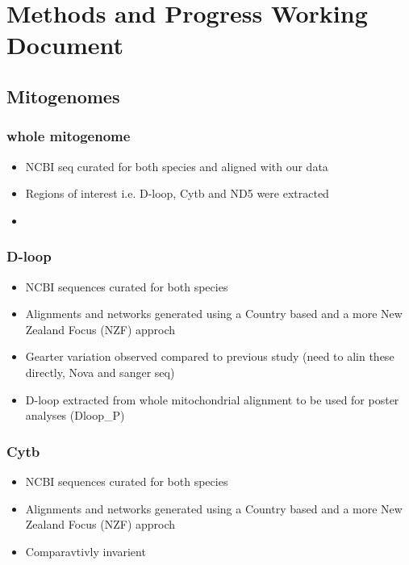 \documentclass[document.tex]{subfiles}
\begin{document}
\chapter{Methods and Progress Working Document}
\label{day:2023-02-15}

\section*{Mitogenomes}

    \subsection{whole mitogenome}
        \begin{itemize}
        \item NCBI seq curated for both species and aligned with our data
        \item Regions of interest i.e. D-loop, Cytb and ND5 were extracted 
        \item 
    \end{itemize}

    \subsection{D-loop}
        \begin{itemize}
        \item NCBI sequences curated for both species 
        \item Alignments and networks generated using a Country based and a more New Zealand Focus (NZF) approch
        \item Gearter variation observed compared to previous study (need to alin these directly, Nova and sanger seq)
        \item D-loop extracted from whole mitochondrial alignment to be used for poster analyses (Dloop_P)
    \end{itemize}

    \subsection{Cytb}
        \begin{itemize}
        \item NCBI sequences curated for both species 
        \item Alignments and networks generated using a Country based and a more New Zealand Focus (NZF) approch
        \item Comparavtivly invarient 
    \end{itemize}
        
\end{document}
